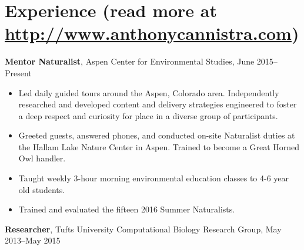 \documentclass[10pt, letter]{article}
\begin{document}
\vspace{-15pt}
\section*{Experience \textnormal{\small (read more at \url{http://www.anthonycannistra.com})}}
{\bf Mentor Naturalist}, {Aspen Center for Environmental Studies}, June 2015--Present\\
\vspace*{-.15in}
\begin{itemize}[topsep=0pt,itemsep=-1pt]
  \item Led daily guided tours around the Aspen, Colorado area. Independently researched and developed content and delivery strategies engineered to foster a deep respect and curiosity for place in a diverse group of participants. 
  \item Greeted guests, answered phones, and conducted on-site Naturalist duties at the Hallam Lake Nature Center in Aspen. Trained to become a Great Horned Owl handler.
  \item Taught weekly 3-hour morning environmental education classes to 4-6 year old students.
  \item Trained and evaluated the fifteen 2016 Summer Naturalists.
\end{itemize}
\vspace{6pt}
{\bf Researcher}, { Tufts University Computational Biology Research Group}, May 2013--May 2015\\
\end{document}
